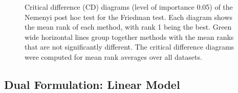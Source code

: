 \begin{figure}[!p]
  \centering
  
  \caption{Critical difference (CD) diagrams (level of importance 0.05) of the Nemenyi post hoc test for the Friedman test. Each diagram shows the mean rank of each method, with rank 1 being the best. Green wide horizontal lines group together methods with the mean ranks that are not significantly different. The critical difference diagrams were computed for mean rank averages over all datasets.}
  \label{fig: critical diagrams primal}
\end{figure}

\newpage

\subsection{Dual Formulation: Linear Model}

